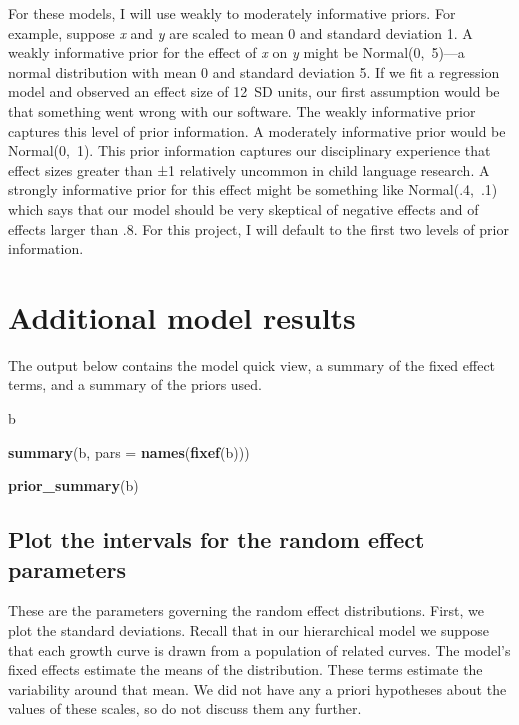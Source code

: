 \documentclass [11pt, proquest] {uwthesis}[2015/03/03]
\newenvironment{Shaded}{}{}
\newcommand{\KeywordTok}[1]{\textcolor[rgb]{0.00,0.44,0.13}{\textbf{{#1}}}}
\newcommand{\DataTypeTok}[1]{\textcolor[rgb]{0.56,0.13,0.00}{{#1}}}
\newcommand{\NormalTok}[1]{{#1}}
\begin{document}
For these models, I will use weakly to moderately informative priors.
For example, suppose \emph{x} and \emph{y} are scaled to mean 0 and
standard deviation 1. A weakly informative prior for the effect of
\emph{x} on \emph{y} might be Normal(0,~5)---a normal distribution with
mean 0 and standard deviation 5. If we fit a regression model and
observed an effect size of 12~SD units, our first assumption would be
that something went wrong with our software. The weakly informative
prior captures this level of prior information. A moderately informative
prior would be Normal(0,~1). This prior information captures our
disciplinary experience that effect sizes greater than ±1 relatively
uncommon in child language research. A strongly informative prior for
this effect might be something like Normal(.4,~.1) which says that our
model should be very skeptical of negative effects and of effects larger
than .8. For this project, I will default to the first two levels of
prior information.

\section{Additional model results}\label{additional-model-results}

The output below contains the model quick view, a summary of the fixed
effect terms, and a summary of the priors used.
\begin{Shaded}
\begin{Highlighting}[]
\NormalTok{b}

\KeywordTok{summary}\NormalTok{(b, }\DataTypeTok{pars =} \KeywordTok{names}\NormalTok{(}\KeywordTok{fixef}\NormalTok{(b)))}

\KeywordTok{prior_summary}\NormalTok{(b)}
\end{Highlighting}
\end{Shaded}
\subsection{Plot the intervals for the random effect
parameters}\label{plot-the-intervals-for-the-random-effect-parameters}

These are the parameters governing the random effect distributions.
First, we plot the standard deviations. Recall that in our hierarchical
model we suppose that each growth curve is drawn from a population of
related curves. The model's fixed effects estimate the means of the
distribution. These terms estimate the variability around that mean. We
did not have any a priori hypotheses about the values of these scales,
so do not discuss them any further.
\end{document}
